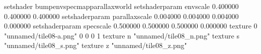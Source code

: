 setshader bumpenvspecmapparallaxworld
setshaderparam envscale 0.400000 0.400000 0.400000
setshaderparam parallaxscale 0.004000 0.004000 0.004000 0.000000
setshaderparam specscale 0.500000 0.500000 0.500000 0.000000
texture 0 "unnamed/tile08-a.png" 0 0 0 1
texture n "unnamed/tile08_n.png"
texture s "unnamed/tile08_s.png"
texture z "unnamed/tile08_z.png"